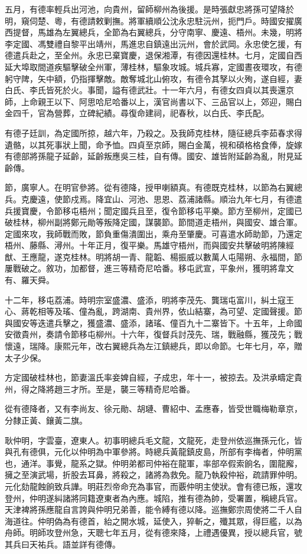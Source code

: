 \begin{pinyinscope}
五月，有德率輕兵出河池，向貴州，留師柳州為後援。是時張獻忠將孫可望降於明，窺伺楚、粵，有德請敕剿撫。將軍續順公沈永忠駐沅州，扼門戶。時國安擢廣西提督，馬雄為左翼總兵，全節為右翼總兵，分守南寧、慶遠、梧州。未幾，明將李定國、馮雙禮自黎平出靖州，馬進忠自鎮遠出沅州，會於武岡。永忠使乞援，有德遣兵赴之，至全州。永忠已棄寶慶，退保湘潭，有德因還桂林。七月，定國自西延大埠取間道疾驅擊破全州軍，薄桂林，驅象攻城。城兵寡，定國晝夜環攻，有德躬守陴，矢中額，仍指揮擊敵。敵奪城北山俯攻，有德令其孥以火殉，遂自經，妻白氏、李氏皆死於火。事聞，謚有德武壯。十一年六月，有德女四貞以其喪還京師，上命親王以下、阿思哈尼哈番以上，漢官尚書以下、三品官以上，郊迎，賜白金四千，官為營葬，立碑紀績。尋復命建祠，祀春秋，以白氏、李氏配。

有德子廷訓，為定國所掠，越六年，乃殺之。及我師克桂林，隨征總兵李茹春求得遺骼，以其死事狀上聞，命予恤。四貞至京師，賜白金萬，視和碩格格食俸，旋嫁有德部將孫龍子延齡，延齡叛應吳三桂，自有傳。國安、雄皆附延齡為亂，附見延齡傳。

節，廣寧人。在明官參將。從有德降，授甲喇額真。有德既克桂林，以節為右翼總兵。克慶遠，使節戍焉。降宜山、河池、思恩、荔浦諸縣。順治九年七月，有德遣兵援寶慶，令節移屯梧州；聞定國兵且至，復令節移屯平樂。節方至柳州，定國已破桂林，柳州副將鄭元勛等叛降定國，謀襲節。節間道走梧州，與國安、雄合軍。定國來攻，我師戰而敗，節負重傷潰圍出，乘舟至肇慶。可喜遣水師助節，乃還定梧州、藤縣、潯州。十年正月，復平樂。馬雄守梧州，而與國安共擊破明將陳經猷、王應龍，遂克桂林。明將胡一青、龍韜、楊振威以數萬人屯陽朔、永福間，節屢戰破之。敘功，加都督，進三等精奇尼哈番。移屯武宣，平象州，獲明將韋文有、羅天舜。

十二年，移屯荔浦。時明宗室盛濃、盛添，明將李茂先、龔瑞屯富川，糾土寇王心、蔣乾相等及瑤、僮為亂，跨湖南、貴州界，依山結寨，為可望、定國聲援。節與國安等迭遣兵擊之，獲盛濃、盛添，諸瑤、僮百九十二寨皆下。十五年，上命國安徵貴州，奏請令節移屯柳州。十六年，復督兵討茂先、瑞，戰融縣，獲茂先；戰懷遠，瑞降。康熙元年，改右翼總兵為左江鎮總兵，即以命節。七年七月，卒，贈太子少保。

方定國破桂林也，節妻溫氏率妾婢自經，子成忠，年十一，被掠去。及洪承疇定貴州，得之降將趙三才所。至是，襲三等精奇尼哈番。

從有德降者，又有李尚友、徐元勛、胡璉、曹紹中、孟應春，皆受世職梅勒章京，分隸正黃、鑲黃二旗。

耿仲明，字雲臺，遼東人。初事明總兵毛文龍，文龍死，走登州依巡撫孫元化，皆與孔有德俱，元化以仲明為中軍參將。時總兵黃龍鎮皮島，所部有李梅者，仲明黨也，通洋。事覺，龍系之獄。仲明弟都司仲裕在龍軍，率部卒假索餉名，圍龍廨，擁之至演武場，折股去耳鼻，將殺之，諸將為救免。龍乃執殺仲裕，疏請罪仲明。元化劾龍蝕餉致兵譁。明莊烈帝命充為事官，而覈仲明主使狀。會有德已叛，還攻登州，仲明遂糾諸將同籍遼東者為內應。城陷，推有德為帥，受署置，稱總兵官。天津裨將孫應龍自言誇與仲明兄弟善，能令縛有德以降。巡撫鄭宗周使將二千人自海道往。仲明偽為有德首，紿之開水城，延使入，猝斬之，殲其眾，得巨艦，以為舟師。明師攻登州急，天聰七年五月，從有德來降，上禮遇優異，授以總兵官，號其兵曰天祐兵。語並詳有德傳。


\end{pinyinscope}
